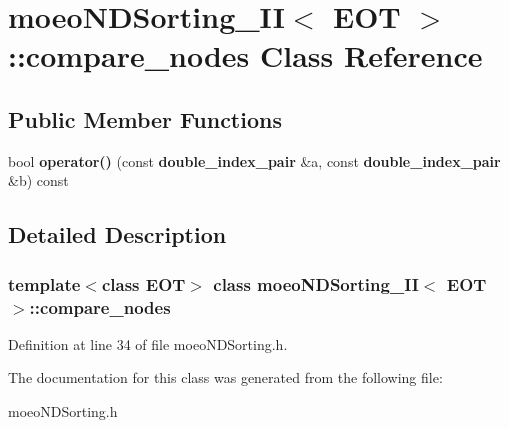 \section{moeo\-NDSorting\_\-II$<$ EOT $>$::compare\_\-nodes Class Reference}
\label{classmoeoNDSorting__II_1_1compare__nodes}
\subsection*{Public Member Functions}
\begin{CompactItemize}
\item 
bool {\bf operator()} (const {\bf double\_\-index\_\-pair} \&a, const {\bf double\_\-index\_\-pair} \&b) const \label{classmoeoNDSorting__II_1_1compare__nodes_e1052afbabd0e4f14b7913cd1afcd824}

\end{CompactItemize}


\subsection{Detailed Description}
\subsubsection*{template$<$class EOT$>$ class moeo\-NDSorting\_\-II$<$ EOT $>$::compare\_\-nodes}





Definition at line 34 of file moeo\-NDSorting.h.

The documentation for this class was generated from the following file:\begin{CompactItemize}
\item 
moeo\-NDSorting.h\end{CompactItemize}
